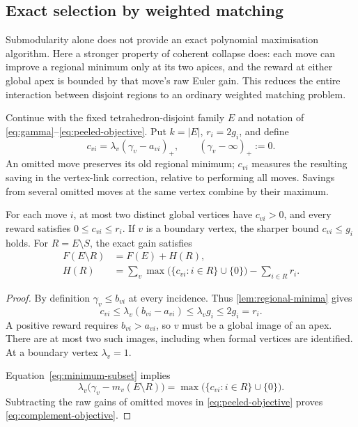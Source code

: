 \subsection{Exact selection by weighted matching}
\label{sec:matching-selection}

Submodularity alone does not provide an exact polynomial maximisation
algorithm. Here a stronger property of coherent collapse does: each
move can improve a regional minimum only at its two apices, and the
reward at either global apex is bounded by that move's raw Euler gain.
This reduces the entire interaction between disjoint regions to an
ordinary weighted matching problem.

Continue with the fixed tetrahedron-disjoint family $E$ and notation
of \eqref{eq:gamma}--\eqref{eq:peeled-objective}. Put $k=|E|$,
$r_i=2g_i$, and define
\begin{equation}\label{eq:omission-rewards}
 c_{vi}=\lambda_v(\gamma_v-a_{vi})_+,
 \qquad (\gamma_v-\infty)_+:=0.
\end{equation}
An omitted move preserves its old regional minimum; $c_{vi}$ measures
the resulting saving in the vertex-link correction, relative to
performing all moves. Savings from several omitted moves at the same
vertex combine by their maximum.

\begin{lemma}
\label{lem:omission-reward-bound}
For each move $i$, at most two distinct global vertices have
$c_{vi}>0$, and every reward satisfies $0\le c_{vi}\le r_i$.
If $v$ is a boundary vertex, the sharper bound $c_{vi}\le g_i$ holds.
For $R=E\setminus S$, the exact gain satisfies
\begin{equation}\label{eq:complement-objective}
 \begin{split}
 F(E\setminus R)&=F(E)+H(R),\\
 H(R)&=\sum_v\max\bigl(\{c_{vi}:i\in R\}\cup\{0\}\bigr)
             -\sum_{i\in R}r_i.
 \end{split}
\end{equation}
\end{lemma}
\begin{proof}
By definition $\gamma_v\le b_{vi}$ at every incidence. Thus
\cref{lem:regional-minima} gives
\[
 c_{vi}\le\lambda_v(b_{vi}-a_{vi})\le\lambda_v g_i
          \le 2g_i=r_i.
\]
A positive reward requires $b_{vi}>a_{vi}$, so $v$ must be a global
image of an apex. There are at most two such images, including when
formal vertices are identified. At a boundary vertex $\lambda_v=1$.

Equation~\eqref{eq:minimum-subset} implies
\[
 \lambda_v\bigl(\gamma_v-m_v(E\setminus R)\bigr)
    =\max\bigl(\{c_{vi}:i\in R\}\cup\{0\}\bigr).
\]
Subtracting the raw gains of omitted moves in
\eqref{eq:peeled-objective} proves \eqref{eq:complement-objective}.
\end{proof}

